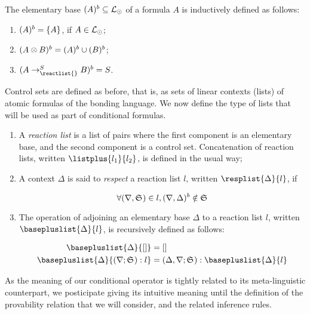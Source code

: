 \begin{definition}
  The elementary base $(A)^{b} \subseteq \mathcal{L}_{\odot}$ of a formula $A$ is
  inductively defined as follows:

  \begin{enumerate}
  \item $(A)^{b} = \{ A \}$, if $A \in \mathcal{L}_{\odot}$;
  \item $(A \otimes B)^{b} = (A)^{b} \cup (B)^{b}$;
  \item $\elembases{A \rightarrow_{\reactlist{}}^S B} = S$.
  \end{enumerate}
\end{definition}

Control sets are defined as before, that is, as sets of linear contexts (lists)
of atomic formulas of the bonding language. We now define the type of lists that
will be used as part of conditional formulas.

\begin{definition}
  \begin{enumerate}
  \item A \emph{reaction list} is a list of pairs where the first component is
    an elementary base, and the second component is a control set. Concatenation
    of reaction lists, written $\listplus{l_1}{l_2}$, is defined in the usual
    way;
  \item A context $\Delta$ is said to \emph{respect} a reaction list $l$,
    written $\resplist{\Delta}{l}$, if

    \[
      \forall (\nabla, \mathfrak{S}_{})\in l, (\nabla, \Delta)^{b} \notin \mathfrak{S}_{}
    \]

  \item The operation of adjoining an elementary base $\Delta$ to a reaction
    list $l$, written $\basepluslist{\Delta}{l}$, is recursively defined as
    follows:

    \begin{align*}
      \basepluslist{\Delta}{[]} &= [] \\
      \basepluslist{\Delta}{(\nabla;\ctrlset{}):l} &= (\Delta,\nabla;\ctrlset{}):\basepluslist{\Delta}{l}
    \end{align*}
  \end{enumerate}
\end{definition}

As the meaning of our conditional operator is tightly related to its
meta-linguistic counterpart, we posticipate giving its intuitive meaning until
the definition of the provability relation that we will consider, and the
related inference rules.

